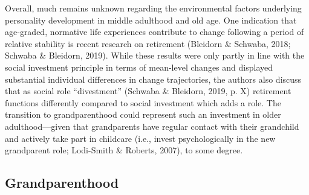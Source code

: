 \documentclass[
  english,
  man, noextraspace]{apa7}
\begin{document}
Overall, much remains unknown regarding the environmental factors underlying personality development in middle adulthood and old age. One indication that age-graded, normative life experiences contribute to change following a period of relative stability is recent research on retirement (Bleidorn \& Schwaba, 2018; Schwaba \& Bleidorn, 2019). While these results were only partly in line with the social investment principle in terms of mean-level changes and displayed substantial individual differences in change trajectories, the authors also discuss that as social role \enquote{divestment} (Schwaba \& Bleidorn, 2019, p. X) retirement functions differently compared to social investment which adds a role. The transition to grandparenthood could represent such an investment in older adulthood---given that grandparents have regular contact with their grandchild and actively take part in childcare (i.e., invest psychologically in the new grandparent role; Lodi-Smith \& Roberts, 2007), to some degree.

\hypertarget{grandparenthood}{%
\subsection{Grandparenthood}\label{grandparenthood}}
\end{document}
